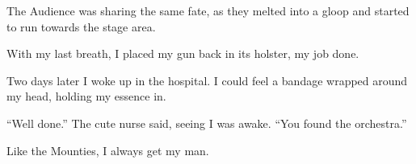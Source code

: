 The Audience was sharing the same fate, as they melted into a gloop
and started to run towards the stage area.

With my last breath, I placed my gun back in its holster, my job
done.



Two days later I woke up in the hospital. I could feel a bandage
wrapped around my head, holding my essence in.



``Well done.'' The cute nurse said, seeing I was awake.
``You found the orchestra.''



Like the Mounties, I always get my man. 

 



